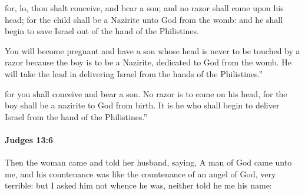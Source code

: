 			\begin{versebox}
					\item[BHS] 
					\item[ASV] for, lo, thou shalt conceive, and bear a son; and no razor shall come upon his head; for the child shall be a Nazirite unto God from the womb: and he shall begin to save Israel out of the hand of the Philistines.
					\item[NIV] You will become pregnant and have a son whose head is never to be touched by a razor because the boy is to be a Nazirite, dedicated to God from the womb. He will take the lead in delivering Israel from the hands of the Philistines.”
					\item[NRSV] for you shall conceive and bear a son. No razor is to come on his head, for the boy shall be a nazirite to God from birth. It is he who shall begin to deliver Israel from the hand of the Philistines.”
			\end{versebox}

		\paragraph{Judges 13:6} %
			\label{JUDGES-13-6}

			Then the woman came and told her husband, saying, A man of God came unto me, and his countenance was like the countenance of an angel of God, very terrible: but I asked him not whence he was, neither told he me his name:

